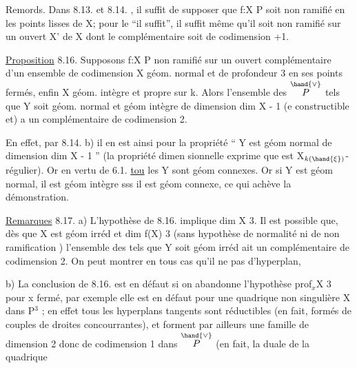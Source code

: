 


Remords. Dans 8.13. et 8.14. , il suffit de supposer que f:X\hand{$\to$} P soit non
ramifié en les points lisses de X; pour le ``il suffit'', il suffit même
qu'il soit non ramifié sur un ouvert X' de X dont le complémentaire soit
de codimension \hand{$\geqslant$} +1.

\uline{Proposition} 8.16. Supposons f:X\hand{$\to$} P non ramifié sur un ouvert
complémentaire d'un ensemble de codimension  X géom. normal et
de profondeur\hand{$\geqslant$} 3 en ses points fermés, enfin X géom. intègre et propre
sur k. Alors l'ensemble des \hand{$\xi \in$} $\overset{\hand{\vee}}{P}$ tels que 
Y\hand{$_\xi$} soit géom. normal et géom intègre de dimension dim X - 1 (e
constructible et) a un complémentaire de codimension \hand{$\geqslant$} 2.

En effet, par 8.14. b) il en est ainsi pour la propriété
`` Y\hand{$_\xi$} est géom normal de dimension dim X - 1 '' (la propriété dimen
sionnelle exprime que \hand{$\phi_\xi$} est X$_{k(\hand{\xi})}$-régulier). Or en vertu de 6.1.
\uline{tou} les Y\hand{$_\xi$} sont géom connexes. Or si Y\hand{$_\xi$} est géom normal, il est
géom intègre sss il est géom connexe, ce qui achève la démonstration.

\uline{Remarques} 8.17. a) L'hypothèse de 8.16. implique dim X \hand{$\geqslant$} 3. Il est possible que, dès que X est géom irréd
et dim f(X) \hand{$\geqslant$} 3 (sans hypothèse de normalité ni de non ramification )
l'ensemble des \hand{$\xi$} tels que Y\hand{$_\xi$} soit géom irréd ait un complémentaire
de codimension \hand{$\geqslant$}2. On peut montrer en tous cas qu'il ne pas
d'hyperplan, 

b) La conclusion de 8.16. est en défaut si on abandonne
l'hypothèse prof$_x$X \hand{$\geqslant$} 3 pour x fermé, par exemple elle est en défaut pour
une quadrique non singulière X dans P$^3$ ;  en effet tous les hyperplans tangents
 sont  réductibles (en fait, formés de couples de droites
concourrantes), et forment par ailleurs une famille de dimension 2
 donc de codimension 1 dans $\overset{\hand{\vee}}{P}$ (en fait, la duale de la quadrique  

